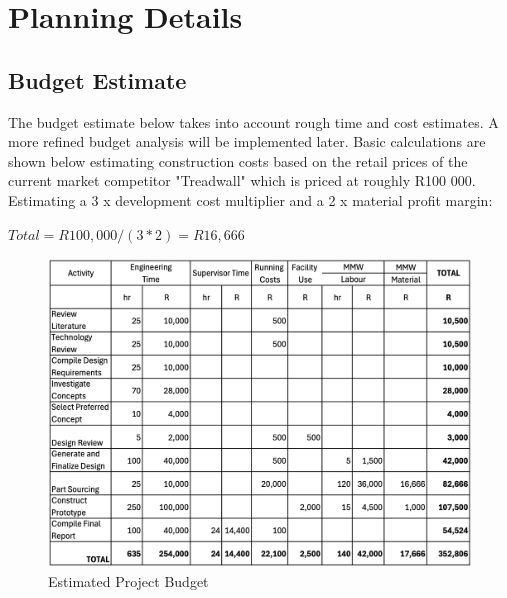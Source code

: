 \chapter{Planning Details}

\section*{Budget Estimate}
The budget estimate below takes into account rough time and cost estimates. A more refined budget analysis will be implemented later.
Basic calculations are shown below estimating construction costs based on the retail prices of the current market competitor "Treadwall" which is priced at roughly R100 000.\\
Estimating a 3 x development cost multiplier and a 2 x material profit margin: 

\noindent
\(Total = R100,000 / (3 * 2) = R 16,666\)\\

\begin{figure}[h]
    \centering
    \includegraphics[width=1\linewidth]{chaps-append/budget.png}
    \caption{Estimated Project Budget}
    \label{fig:budget}
\end{figure}
\newpage


